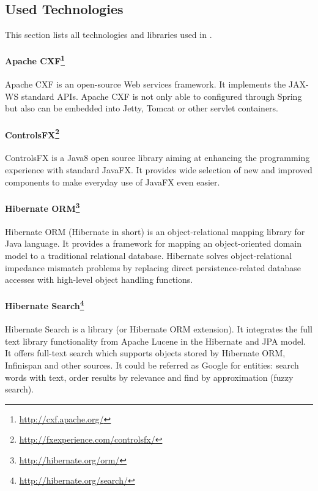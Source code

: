 
\subsection{Used Technologies}

This section lists all technologies and libraries used in \textan{}.

\paragraph{Apache CXF\footnote{\url{http://cxf.apache.org/}}}
Apache CXF is an open-source Web services framework. It implements the JAX-WS 
standard APIs. Apache CXF is not only able to configured through Spring but also can be embedded into Jetty,
Tomcat or other servlet containers.

\paragraph{ControlsFX\footnote{\url{http://fxexperience.com/controlsfx/}}}
ControlsFX is a Java8 open source library aiming at enhancing the programming
experience with standard JavaFX. It provides wide selection of new and improved
components to make everyday use of JavaFX even easier.

\paragraph{Hibernate ORM\footnote{\url{http://hibernate.org/orm/}}}
Hibernate ORM (Hibernate in short) is an object-relational mapping library for
Java language. It provides a framework for mapping an object-oriented domain
model to a traditional relational database. Hibernate solves object-relational
impedance mismatch problems by replacing direct persistence-related database
accesses with high-level object handling functions.

\paragraph{Hibernate Search\footnote{\url{http://hibernate.org/search/}}}
Hibernate Search is a library (or Hibernate ORM extension). It integrates
the full text library functionality from Apache Lucene in the Hibernate and
JPA model. It offers full-text search which supports objects stored by Hibernate
ORM, Infinispan and other sources. It could be referred as Google\texttrademark{} for
entities: search words with text, order results by relevance and find by
approximation (fuzzy search).

